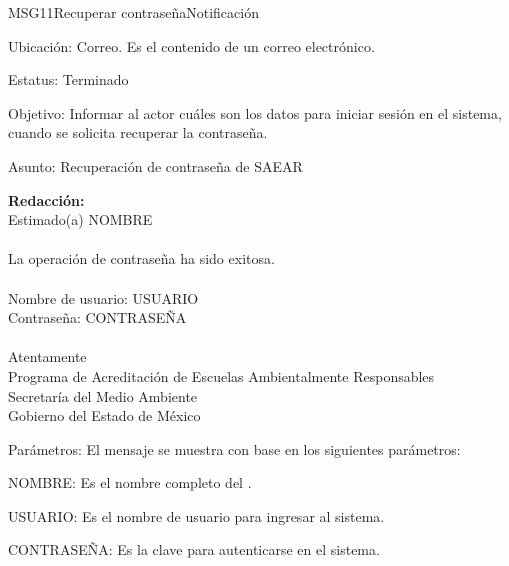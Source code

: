 \begin{mensaje}{MSG11}{Recuperar contraseña}{Notificación}
	\item[Ubicación:] Correo. Es el contenido de un correo electrónico.
	\item[Estatus:] Terminado
	\item[Objetivo:] Informar al actor cuáles son los datos para iniciar sesión en el sistema, cuando se solicita recuperar la contraseña.
	\item[Asunto:] Recuperación de contraseña de SAEAR
	\item[]{\bf Redacción:}\\
			  Estimado(a) NOMBRE\\ \\
			  La operación de contraseña ha sido exitosa.\\ \\
			  Nombre de usuario: USUARIO\\
			  Contraseña: CONTRASEÑA \\ \\
			  Atentamente\\
			  Programa de Acreditación de Escuelas Ambientalmente Responsables\\
			  Secretaría del Medio Ambiente\\
			  Gobierno del Estado de México\\
	\item[Parámetros:] El mensaje se muestra con base en los siguientes parámetros:
	\begin{Citemize}
		\item NOMBRE: Es el nombre completo del .
		\item USUARIO: Es el nombre de usuario para ingresar al sistema.
		\item CONTRASEÑA: Es la clave para autenticarse en el sistema.
	\end{Citemize}
\end{mensaje}

